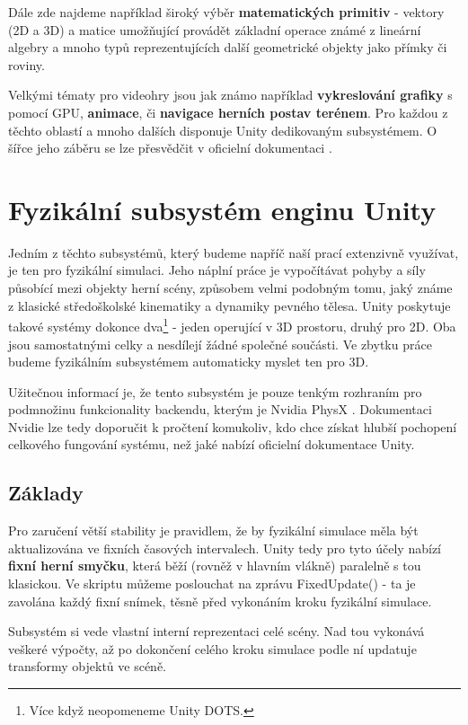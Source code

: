 Dále zde najdeme například široký výběr \textbf{matematických primitiv} - vektory (2D a 3D) a matice umožňující provádět základní operace známé z lineární algebry a mnoho typů reprezentujících další geometrické objekty jako přímky či roviny.

Velkými tématy pro videohry jsou jak známo například \textbf{vykreslování grafiky} s pomocí GPU, \textbf{animace}, či \textbf{navigace herních postav terénem}. Pro každou z těchto oblastí a mnoho dalších disponuje Unity dedikovaným subsystémem. O šířce jeho záběru se lze přesvědčit v oficielní dokumentaci \cite{Unity}.

\section{Fyzikální subsystém enginu Unity}

Jedním z těchto subsystémů, který budeme napříč naší prací extenzivně využívat, je ten pro fyzikální simulaci. Jeho náplní práce je vypočítávat pohyby a síly působící mezi objekty herní scény, způsobem velmi podobným tomu, jaký známe z klasické středoškolské kinematiky a dynamiky pevného tělesa. Unity poskytuje takové systémy dokonce dva\footnote{Více když neopomeneme Unity DOTS.} - jeden operující v 3D prostoru, druhý pro 2D. Oba jsou samostatnými celky a nesdílejí žádné společné součásti. Ve zbytku práce budeme fyzikálním subsystémem automaticky myslet ten pro 3D.   

Užitečnou informací je, že tento subsystém je pouze tenkým rozhraním pro podmnožinu funkcionality backendu, kterým je Nvidia PhysX \cite{PhysX}. Dokumentaci Nvidie \cite{PhysX} lze tedy doporučit k pročtení komukoliv, kdo chce získat hlubší pochopení celkového fungování systému, než jaké nabízí oficielní dokumentace Unity.

\subsection{Základy}

Pro zaručení větší stability je pravidlem, že by fyzikální simulace měla být aktualizována ve fixních časových intervalech. Unity tedy pro tyto účely nabízí \textbf{fixní herní smyčku}, která běží (rovněž v hlavním vlákně) paralelně s tou klasickou. Ve skriptu můžeme poslouchat na zprávu FixedUpdate() - ta je zavolána každý fixní snímek, těsně před vykonáním kroku fyzikální simulace. 

Subsystém si vede vlastní interní reprezentaci celé scény. Nad tou vykonává veškeré výpočty, až po dokončení celého kroku simulace podle ní updatuje transformy objektů ve scéně. 

